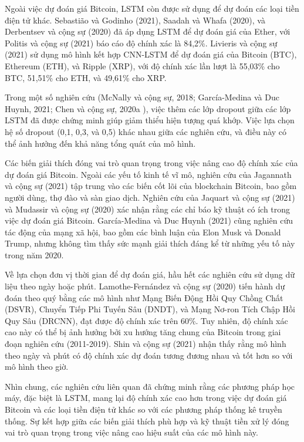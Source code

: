 Ngoài việc dự đoán giá Bitcoin, LSTM còn được sử dụng để dự đoán các loại tiền điện tử khác. Sebastião và Godinho (2021), Saadah và Whafa (2020), và Derbentsev và cộng sự (2020) đã áp dụng LSTM để dự đoán giá của Ether, với Politis và cộng sự (2021) báo cáo độ chính xác là 84,2\%. Livieris và cộng sự (2021) sử dụng mô hình kết hợp CNN-LSTM để dự đoán giá của Bitcoin (BTC), Ethereum (ETH), và Ripple (XRP), với độ chính xác lần lượt là 55,03\% cho BTC, 51,51\% cho ETH, và 49,61\% cho XRP.

Trong một số nghiên cứu (McNally và cộng sự, 2018\cite{8}; García-Medina và Duc Huynh, 2021; Chen và cộng sự, 2020a \cite{10}), việc thêm các lớp dropout giữa các lớp LSTM đã được chứng minh giúp giảm thiểu hiện tượng quá khớp. Việc lựa chọn hệ số dropout (0,1, 0,3, và 0,5) khác nhau giữa các nghiên cứu, và điều này có thể ảnh hưởng đến khả năng tổng quát của mô hình.

Các biến giải thích đóng vai trò quan trọng trong việc nâng cao độ chính xác của dự đoán giá Bitcoin. Ngoài các yếu tố kinh tế vĩ mô, nghiên cứu của Jagannath và cộng sự (2021) tập trung vào các biến cốt lõi của blockchain Bitcoin, bao gồm người dùng, thợ đào và sàn giao dịch. Nghiên cứu của Jaquart và cộng sự (2021) và Mudassir và cộng sự (2020) xác nhận rằng các chỉ báo kỹ thuật có ích trong việc dự đoán giá Bitcoin. García-Medina và Duc Huynh (2021) cũng nghiên cứu tác động của mạng xã hội, bao gồm các bình luận của Elon Musk và Donald Trump, nhưng không tìm thấy sức mạnh giải thích đáng kể từ những yếu tố này trong năm 2020.

Về lựa chọn đơn vị thời gian để dự đoán giá, hầu hết các nghiên cứu sử dụng dữ liệu theo ngày hoặc phút. Lamothe-Fernández và cộng sự (2020) tiến hành dự đoán theo quý bằng các mô hình như Mạng Biến Động Hồi Quy Chồng Chất (DSVR), Chuyển Tiếp Phi Tuyến Sâu (DNDT), và Mạng Nơ-ron Tích Chập Hồi Quy Sâu (DRCNN), đạt được độ chính xác trên 60\%. Tuy nhiên, độ chính xác cao này có thể bị ảnh hưởng bởi xu hướng tăng chung của Bitcoin trong giai đoạn nghiên cứu (2011-2019). Shin và cộng sự (2021) nhận thấy rằng mô hình theo ngày và phút có độ chính xác dự đoán tương đương nhau và tốt hơn so với mô hình theo giờ.

Nhìn chung, các nghiên cứu liên quan đã chứng minh rằng các phương pháp học máy, đặc biệt là LSTM, mang lại độ chính xác cao hơn trong việc dự đoán giá Bitcoin và các loại tiền điện tử khác so với các phương pháp thống kê truyền thống. Sự kết hợp giữa các biến giải thích phù hợp và kỹ thuật tiền xử lý đóng vai trò quan trọng trong việc nâng cao hiệu suất của các mô hình này.
